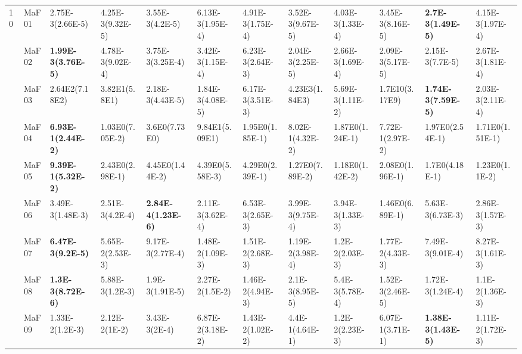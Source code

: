 \documentclass[]{article}
\begin{document}
\begin{landscape}
\begin{table}
\begin{footnotesize}
\begin{tabular}{|l|l|l|l|l|l|l|l|l|l|l|l|}
\multirow{15}{*}{10} & MaF01 & \cellcolor{gray95} 2.75E-3(2.66E-5) & 4.25E-3(9.32E-5) & 3.55E-3(4.2E-5) & 6.13E-3(1.95E-4) & 4.91E-3(1.75E-4) & 3.52E-3(9.67E-5) & 4.03E-3(1.33E-4) & \cellcolor{gray95} 3.45E-3(8.16E-5) & \cellcolor{gray95} {\bf 2.7E-3(1.49E-5)} & 4.15E-3(1.97E-4)\\
 & MaF02 & \cellcolor{gray95} {\bf 1.99E-3(3.76E-5)} & 4.78E-3(9.02E-4) & 3.75E-3(3.25E-4) & 3.42E-3(1.15E-4) & 6.23E-3(2.64E-3) & \cellcolor{gray95} 2.04E-3(2.25E-5) & 2.66E-3(1.69E-4) & \cellcolor{gray95} 2.09E-3(5.17E-5) & \cellcolor{gray95} 2.15E-3(7.7E-5) & 2.67E-3(1.81E-4)\\
 & MaF03 & 2.64E2(7.18E2) & 3.82E1(5.8E1) & 2.18E-3(4.43E-5) & \cellcolor{gray95} 1.84E-3(4.08E-5) & 6.17E-3(3.51E-3) & 4.23E3(1.84E3) & 5.69E-3(1.11E-2) & 1.7E10(3.17E9) & \cellcolor{gray95} {\bf 1.74E-3(7.59E-5)} & \cellcolor{gray95} 2.03E-3(2.11E-4)\\
 & MaF04 & \cellcolor{gray95} {\bf 6.93E-1(2.44E-2)} & 1.03E0(7.05E-2) & 3.6E0(7.73E0) & 9.84E1(5.09E1) & 1.95E0(1.85E-1) & \cellcolor{gray95} 8.02E-1(4.32E-2) & 1.87E0(1.24E-1) & \cellcolor{gray95} 7.72E-1(2.97E-2) & 1.97E0(2.54E-1) & 1.71E0(1.51E-1)\\
 & MaF05 & \cellcolor{gray95} {\bf 9.39E-1(5.32E-2)} & 2.43E0(2.98E-1) & 4.45E0(1.44E-2) & 4.39E0(5.58E-3) & 4.29E0(2.39E-1) & \cellcolor{gray95} 1.27E0(7.89E-2) & \cellcolor{gray95} 1.18E0(1.42E-2) & 2.08E0(1.96E-1) & 1.7E0(4.18E-1) & \cellcolor{gray95} 1.23E0(1.1E-2)\\
 & MaF06 & 3.49E-3(1.48E-3) & \cellcolor{gray95} 2.51E-3(4.2E-4) & \cellcolor{gray95} {\bf 2.84E-4(1.23E-6)} & \cellcolor{gray95} 2.11E-3(3.62E-4) & 6.53E-3(2.65E-3) & 3.99E-3(9.75E-4) & 3.94E-3(1.33E-3) & 1.46E0(6.89E-1) & 5.63E-3(6.73E-3) & 2.86E-3(1.57E-3)\\
 & MaF07 & \cellcolor{gray95} {\bf 6.47E-3(9.2E-5)} & 5.65E-2(2.53E-3) & \cellcolor{gray95} 9.17E-3(2.77E-4) & 1.48E-2(1.09E-3) & 1.51E-2(2.68E-3) & 1.19E-2(3.98E-4) & 1.2E-2(2.03E-3) & 1.77E-2(4.33E-3) & \cellcolor{gray95} 7.49E-3(9.01E-4) & \cellcolor{gray95} 8.27E-3(1.61E-3)\\
 & MaF08 & \cellcolor{gray95} {\bf 1.3E-3(8.72E-6)} & 5.88E-3(1.2E-3) & 1.9E-3(1.91E-5) & 2.27E-2(1.5E-2) & 1.46E-2(4.94E-3) & 2.1E-3(8.95E-5) & 5.4E-3(5.78E-4) & \cellcolor{gray95} 1.52E-3(2.46E-5) & \cellcolor{gray95} 1.72E-3(1.24E-4) & 1.1E-2(1.36E-3)\\
 & MaF09 & 1.33E-2(1.2E-3) & 2.12E-2(1E-2) & \cellcolor{gray95} 3.43E-3(2E-4) & 6.87E-2(3.18E-2) & 1.43E-2(1.02E-2) & 4.4E-1(4.64E-1) & 1.2E-2(2.23E-3) & 6.07E-1(3.71E-1) & \cellcolor{gray95} {\bf 1.38E-3(1.43E-5)} & 1.11E-2(1.72E-3)\\

\end{tabular}
\end{footnotesize}
\end{table}
\end{landscape}
\end{document}
